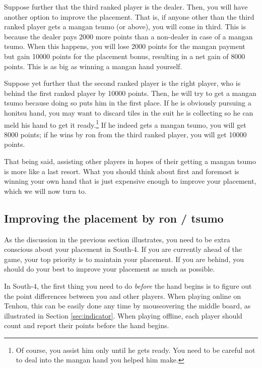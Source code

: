 \bigskip
Suppose further that the third ranked player is the dealer. Then, you will have another option to improve the placement. That is, if anyone other than the third ranked player gets a {\jap mangan tsumo} (or above), you will come in third. This is because the dealer pays 2000 more points than a non-dealer in case of a {\jap mangan tsumo}. When this happens, you will lose 2000 points for the {\jap mangan} payment but gain 10000 points for the placement bonus, resulting in a net gain of 8000 points. This is as big as winning a {\jap mangan} hand yourself.

\bigskip
Suppose yet further that the second ranked player is the right player, who is behind the first ranked player by 10000 points. Then, he will try to get a {\jap mangan tsumo} because doing so puts him in the first place. If he is obviously pursuing a {\jap honitsu} hand, you may want to discard tiles in the suit he is collecting so he can meld his hand to get it ready.\footnote{Of course, you assist him only until he gets ready. You need to be careful not to deal into the {\jap mangan} hand you helped him make.} If he indeed gets a {\jap mangan tsumo}, you will get 8000 points; if he wins by {\jap ron} from the third ranked player, you will get 10000 points.

\bigskip
That being said, assisting other players in hopes of their getting a {\jap mangan tsumo} is more like a last resort. What you should think about first and foremost is winning your own hand that is just expensive enough to improve your placement, which we will now turn to.

\subsection*{Improving the placement by {\jap ron} / {\jap tsumo}}
As the discussion in the previous section illustrates, you need to be extra conscious about your placement in South-4. If you are currently ahead of the game, your top priority is to maintain your placement. If you are behind, you should do your best to improve your placement as much as possible.

\bigskip
In South-4, the first thing you need to do \emph{before} the hand begins is to figure out the point differences between you and other players. When playing online on {\jap Tenhou}, this can be easily done any time by mouseovering the middle board, as illustrated in Section \ref{sec:indicator}. When playing offline, each player should count and report their points before the hand begins.

